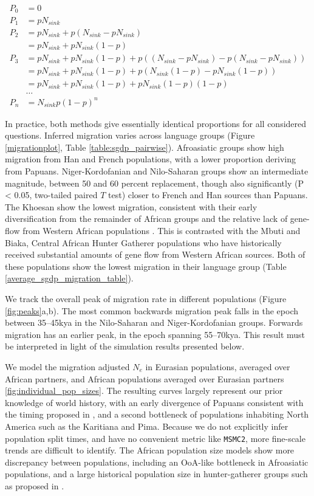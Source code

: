 \documentclass{article}
\begin{document}
$$ \begin{aligned} P_0 &= 0 \\ P_1 &= pN_{sink} \\ P_2 &= pN_{sink} + p(N_{sink} - pN_{sink}) \\ &= pN_{sink} + pN_{sink}(1-p) \\ P_3 &= pN_{sink} + pN_{sink}(1-p) + p((N_{sink}-pN_{sink}) - p(N_{sink}-pN_{sink})) \\ &= pN_{sink} + pN_{sink}(1-p)+p(N_{sink}(1-p)-pN_{sink}(1-p)) \\ &= pN_{sink}+pN_{sink}(1-p)+pN_{sink}(1-p)(1-p) \\ &\dots \\ P_n &=N_{sink}p(1-p)^n \end{aligned} $$

In practice, both methods give essentially identical proportions for all considered questions. Inferred migration varies across language groups (Figure \ref{migrationplot}, Table \ref{table:sgdp_pairwise}). Afroasiatic groups show high migration from Han and French populations, with a lower proportion deriving from Papuans. Niger-Kordofanian and Nilo-Saharan groups show an intermediate magnitude, between 50 and 60 percent replacement, though also significantly (P < 0.05, two-tailed paired $T$ test) closer to French and Han sources than Papuans. The Khoesan show the lowest migration, consistent with their early diversification from the remainder of African groups and the relative lack of gene-flow from Western African populations \cite{Lipson2019}. This is contrasted with the Mbuti and Biaka, Central African Hunter Gatherer populations who have historically received substantial amounts of gene flow from Western African sources. Both of these populations show the lowest migration in their language group (Table \ref{average_sgdp_migration_table}). 

We track the overall peak of migration rate in different populations (Figure \ref{fig:peaks}a,b). The most common backwards migration peak falls in the epoch between 35--45kya in the Nilo-Saharan and Niger-Kordofanian groups. Forwards migration has an earlier peak, in the epoch spanning 55--70kya. This result must be interpreted in light of the simulation results presented below.  

We model the migration adjusted $N_e$ in Eurasian populations, averaged over African partners, and African populations averaged over Eurasian partners \ref{fig:individual_pop_sizes}. The resulting curves largely represent our prior knowledge of world history, with an early divergence of Papuans consistent with the timing proposed in \cite{Malaspinas2016}, and a second bottleneck of populations inhabiting North America such as the Karitiana and Pima. Because we do not explicitly infer population split times, and have no convenient metric like {\tt MSMC2}, more fine-scale trends are difficult to identify. The African population size models show more discrepancy between populations, including an OoA-like bottleneck in Afroasiatic populations, and a large historical population size in hunter-gatherer groups such as proposed in \cite{Lipson2019}. 
\end{document}
